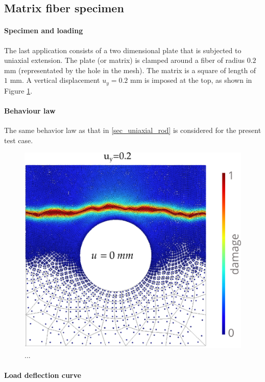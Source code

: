 \subsection{Matrix fiber specimen}

\paragraph{Specimen and loading}

The last application consists of a two dimensional plate that is subjected to uniaxial
extension. The plate (or matrix) is clamped around a fiber of radius $0.2$ mm (representated by the hole in the mesh).
The matrix is a square of length of $1$ mm. A vertical
displacement $u_y = 0.2$ mm is imposed at the top, as shown in Figure \ref{fig_matrix}.

\paragraph{Behaviour law}

The same behavior law as that in \ref{sec_uniaxial_rod} is considered for the present test case.
%
% 
% 
\begin{figure}[H]
    \centering
    \includegraphics[width=7.cm]{../chapter_004_hho_micromorphic/figures/plate.png}
    \caption{...}
    \label{fig_matrix}
\end{figure}

\paragraph{Load deflection curve}

